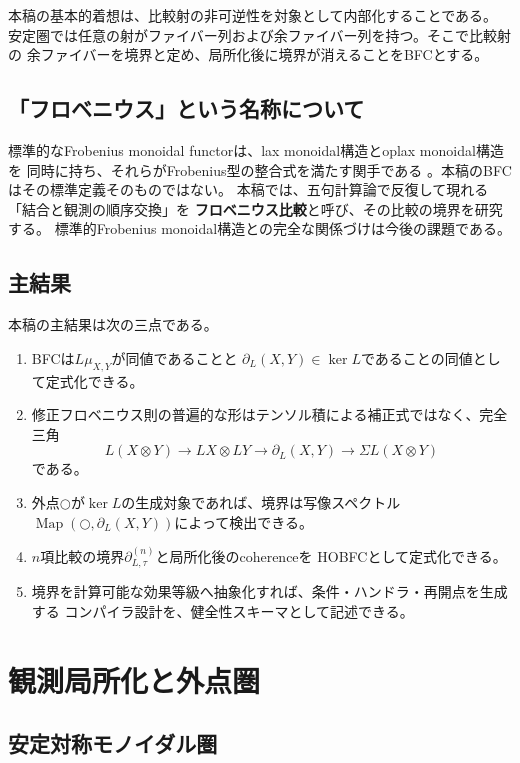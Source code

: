 \documentclass[11pt,a4paper]{ltjsarticle}
\theoremstyle{definition}
\theoremstyle{remark}
\newcommand{\Map}{\operatorname{Map}}
\newcommand{\Boundary}{\partial_L}
\begin{document}
本稿の基本的着想は、比較射の非可逆性を対象として内部化することである。
安定圏では任意の射がファイバー列および余ファイバー列を持つ。そこで比較射の
余ファイバーを境界と定め、局所化後に境界が消えることをBFCとする。

\subsection{「フロベニウス」という名称について}

標準的なFrobenius monoidal functorは、lax monoidal構造とoplax monoidal構造を
同時に持ち、それらがFrobenius型の整合式を満たす関手である
\cite{DayPastro2008}。本稿のBFCはその標準定義そのものではない。
本稿では、五句計算論で反復して現れる「結合と観測の順序交換」を
\textbf{フロベニウス比較}と呼び、その比較の境界を研究する。
標準的Frobenius monoidal構造との完全な関係づけは今後の課題である。

\subsection{主結果}

本稿の主結果は次の三点である。

\begin{enumerate}
 \item BFCは$L\mu_{X,Y}$が同値であることと
 $\Boundary(X,Y)\in\ker L$であることの同値として定式化できる。
 \item 修正フロベニウス則の普遍的な形はテンソル積による補正式ではなく、完全三角
 \[
 L(X\otimes Y)\to LX\otimes LY\to\Boundary(X,Y)
 \to\Sigma L(X\otimes Y)
 \]
 である。
 \item 外点$\bigcirc$が$\ker L$の生成対象であれば、境界は写像スペクトル
 $\Map(\bigcirc,\Boundary(X,Y))$によって検出できる。
 \item $n$項比較の境界$\partial_{L,\tau}^{(n)}$と局所化後のcoherenceを
 HOBFCとして定式化できる。
 \item 境界を計算可能な効果等級へ抽象化すれば、条件・ハンドラ・再開点を生成する
 コンパイラ設計を、健全性スキーマとして記述できる。
\end{enumerate}

\section{観測局所化と外点圏}

\subsection{安定対称モノイダル圏}
\end{document}
